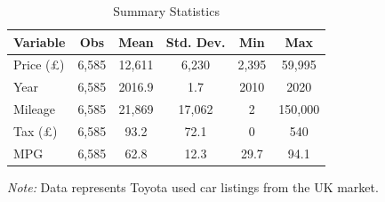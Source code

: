 
\begin{table}[ht]
    \centering
    \caption{Summary Statistics}
    \label{tab:summary_stats}
    \begin{threeparttable}
    \begin{tabular}{lccccc}
        \toprule
        Variable & Obs & Mean & Std. Dev. & Min & Max \\
        \midrule
        Price (\pounds) & 6,585 & 12,611 & 6,230 & 2,395 & 59,995 \\
        Year & 6,585 & 2016.9 & 1.7 & 2010 & 2020 \\
        Mileage & 6,585 & 21,869 & 17,062 & 2 & 150,000 \\
        Tax (\pounds) & 6,585 & 93.2 & 72.1 & 0 & 540 \\
        MPG & 6,585 & 62.8 & 12.3 & 29.7 & 94.1 \\
        \bottomrule
    \end{tabular}
    \begin{tablenotes}
        \small
        \item \textit{Note:} Data represents Toyota used car listings from the UK market.
    \end{tablenotes}
    \end{threeparttable}
\end{table}
